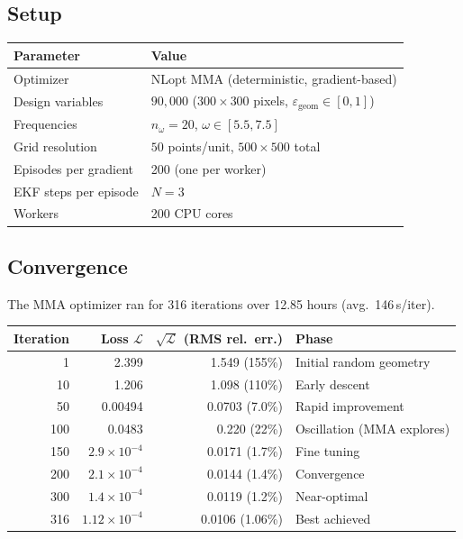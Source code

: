 \documentclass[11pt,a4paper]{article}
\begin{document}
\subsection{Setup}

\begin{center}
\begin{tabular}{@{}ll@{}}
\toprule
Parameter & Value \\
\midrule
Optimizer & NLopt MMA (deterministic, gradient-based) \\
Design variables & $90{,}000$ ($300 \times 300$ pixels, $\varepsilon_{\text{geom}} \in [0,1]$) \\
Frequencies & $n_\omega = 20$, $\omega \in [5.5, 7.5]$ \\
Grid resolution & $50$ points/unit, $500 \times 500$ total \\
Episodes per gradient & 200 (one per worker) \\
EKF steps per episode & $N = 3$ \\
Workers & 200 CPU cores \\
\bottomrule
\end{tabular}
\end{center}

\subsection{Convergence}

The MMA optimizer ran for 316 iterations over 12.85 hours (avg.\ 146\,s/iter).

\begin{center}
\begin{tabular}{@{}rrrl@{}}
\toprule
Iteration & Loss $\mathcal{L}$ & $\sqrt{\mathcal{L}}$ (RMS rel.\ err.) & Phase \\
\midrule
1  & 2.399  & 1.549 (155\%) & Initial random geometry \\
10 & 1.206  & 1.098 (110\%) & Early descent \\
50 & 0.00494 & 0.0703 (7.0\%) & Rapid improvement \\
100 & 0.0483 & 0.220 (22\%) & Oscillation (MMA explores) \\
150 & $2.9 \times 10^{-4}$ & 0.0171 (1.7\%) & Fine tuning \\
200 & $2.1 \times 10^{-4}$ & 0.0144 (1.4\%) & Convergence \\
300 & $1.4 \times 10^{-4}$ & 0.0119 (1.2\%) & Near-optimal \\
316 & $1.12 \times 10^{-4}$ & 0.0106 (1.06\%) & Best achieved \\
\bottomrule
\end{tabular}
\end{center}
\end{document}
